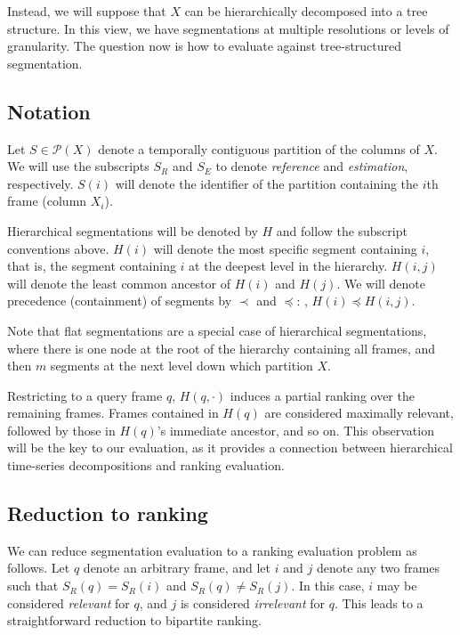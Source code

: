 \documentclass{article}
\begin{document}
Instead, we will suppose that $X$ can be hierarchically decomposed into a tree structure.
In this view, we have segmentations at multiple resolutions or levels of granularity.
The question now is how to evaluate against tree-structured segmentation.

\subsection{Notation}

Let $S \in \mathcal{P}(X)$ denote a temporally contiguous partition of the columns of
$X$.
We will use the subscripts $S_R$ and $S_E$ to denote \emph{reference} and \emph{estimation}, respectively.
$S(i)$ will denote the identifier of the partition containing the $i$th frame (column $X_i$).

Hierarchical segmentations will be denoted by $H$ and follow the subscript conventions
above.  $H(i)$ will denote the most specific segment containing $i$, that is, the
segment containing $i$ at the deepest level in the hierarchy.
$H(i, j)$ will denote the least common ancestor of $H(i)$ and $H(j)$.
We will denote precedence (containment) of segments by $\prec$ and $\preceq$: \eg,
$H(i) \preceq H(i, j)$. 

Note that flat segmentations are a special case of hierarchical segmentations, where there is one node at the root of the hierarchy containing all frames, and then $m$ segments at the next level down which partition $X$.

Restricting to a query frame $q$, $H(q, \cdot)$ induces a partial ranking over the
remaining frames.  Frames contained in $H(q)$ are considered maximally relevant,
followed by those in $H(q)$'s immediate ancestor, and so on.
This observation will be the key to our evaluation, as it provides a connection
between hierarchical time-series decompositions and ranking evaluation.


\subsection{Reduction to ranking}


We can reduce segmentation evaluation to a ranking evaluation problem as follows.
Let $q$ denote an arbitrary frame, and let $i$ and $j$ denote any two frames such that $S_R(q) = S_R(i)$ and $S_R(q) \neq S_R(j)$.
In this case, $i$ may be considered \emph{relevant} for $q$, and $j$ is considered \emph{irrelevant} for $q$.
This leads to a straightforward reduction to bipartite ranking.
\end{document}
